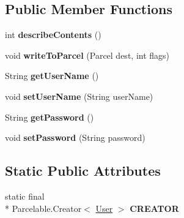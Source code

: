 \subsection*{Public Member Functions}
\begin{DoxyCompactItemize}
\item 
\hypertarget{classcom_1_1github_1_1walterfan_1_1gtd_1_1parcel_1_1User_a022a6d9b44e2bbddef063e959c5640fc}{int {\bfseries describe\-Contents} ()}\label{classcom_1_1github_1_1walterfan_1_1gtd_1_1parcel_1_1User_a022a6d9b44e2bbddef063e959c5640fc}

\item 
\hypertarget{classcom_1_1github_1_1walterfan_1_1gtd_1_1parcel_1_1User_aebc736bb2e6396cd49f94ed49e3f31d3}{void {\bfseries write\-To\-Parcel} (Parcel dest, int flags)}\label{classcom_1_1github_1_1walterfan_1_1gtd_1_1parcel_1_1User_aebc736bb2e6396cd49f94ed49e3f31d3}

\item 
\hypertarget{classcom_1_1github_1_1walterfan_1_1gtd_1_1parcel_1_1User_acdf229bb23ca6a0e747fc57a7a1b0551}{String {\bfseries get\-User\-Name} ()}\label{classcom_1_1github_1_1walterfan_1_1gtd_1_1parcel_1_1User_acdf229bb23ca6a0e747fc57a7a1b0551}

\item 
\hypertarget{classcom_1_1github_1_1walterfan_1_1gtd_1_1parcel_1_1User_af8a7dcbb792911d639d96a486310bd35}{void {\bfseries set\-User\-Name} (String user\-Name)}\label{classcom_1_1github_1_1walterfan_1_1gtd_1_1parcel_1_1User_af8a7dcbb792911d639d96a486310bd35}

\item 
\hypertarget{classcom_1_1github_1_1walterfan_1_1gtd_1_1parcel_1_1User_aded61ba54a3ab71b6b57606cf88546f6}{String {\bfseries get\-Password} ()}\label{classcom_1_1github_1_1walterfan_1_1gtd_1_1parcel_1_1User_aded61ba54a3ab71b6b57606cf88546f6}

\item 
\hypertarget{classcom_1_1github_1_1walterfan_1_1gtd_1_1parcel_1_1User_a49c6f07f2523d19b00159ad508e97947}{void {\bfseries set\-Password} (String password)}\label{classcom_1_1github_1_1walterfan_1_1gtd_1_1parcel_1_1User_a49c6f07f2523d19b00159ad508e97947}

\end{DoxyCompactItemize}
\subsection*{Static Public Attributes}
\begin{DoxyCompactItemize}
\item 
static final \\*
Parcelable.\-Creator$<$ \hyperlink{classcom_1_1github_1_1walterfan_1_1gtd_1_1parcel_1_1User}{User} $>$ {\bfseries C\-R\-E\-A\-T\-O\-R}
\end{DoxyCompactItemize}


